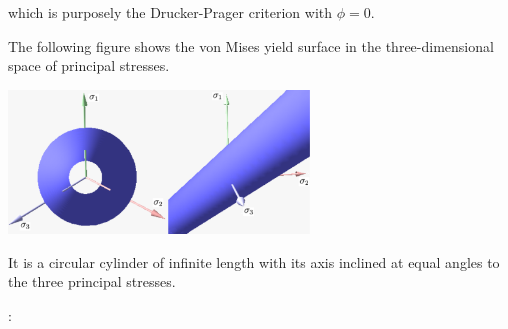 which is purposely the Drucker-Prager criterion with $\phi=0$.


The following figure shows the von Mises yield surface in the three-dimensional space of principal stresses. 
\begin{center}
\includegraphics[width=0.6\textwidth]{images/rheology/vonmises/vonmises.pdf}
\end{center}
It is a circular cylinder of infinite length with its axis inclined at equal angles to the three principal stresses. 

\Literature: \cite{papa87,long03}

